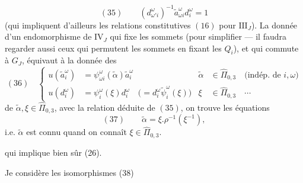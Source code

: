 \[
(35)\qquad(d_{\omega'i}^\omega)^{-1}\widetilde a_{\omega i}^{\omega}d_i^\omega=1
\]
(qui impliquent d'ailleurs les relations constitutives $(16)$ pour $\mathrm{III}_J$). La donnée d'un endomorphisme de $\mathrm{IV}_J$ qui fixe les  sommets (pour simplifier --- il faudra regarder aussi ceux qui permutent les sommets  en fixant les $Q_i$),  et qui commute à $G_J$, équivaut à la donnée des
\[
(36)\quad\left\{\begin{aligned}
u(\widetilde a_i^\omega)&=\psi_{\omega i}^\omega(\widetilde\alpha)\widetilde a_i^\omega
&\widetilde\alpha&\in\widehat\Pi_{0,3}\quad\text{(indép. de }i,\omega\text{)}\\
u(d_i^\omega)&=\psi_i^\omega(\xi)d_i^\omega\quad\bigl(=d_i^\omega\widetilde\psi_i^\omega(\xi)\bigr)
&\xi&\in\widehat\Pi_{0,3}\quad\cdots
\end{aligned}\right.
\]
de $\widetilde\alpha,\xi\in\widehat\Pi_{0,3}$, avec la relation déduite de $(35)$, on trouve les équations
\[
(37)\qquad\widetilde\alpha=\xi.\rho^{-1}(\xi^{-1}),
\]
i.e. $\widetilde\alpha$ est connu quand on connaît $\xi\in\widehat\Pi_{0,3}$.

qui implique bien sûr (26).

Je  considère les isomorphismes
\quad(38)

